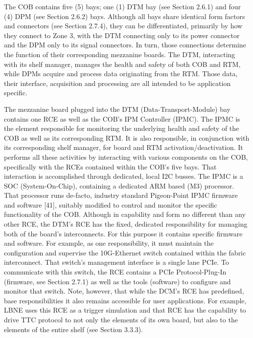 The COB contains five (5) bays; one (1) DTM bay (see Section 2.6.1) and four (4) DPM (see Section 2.6.2) bays. Although all bays share identical form factors and connectors (see Section 2.7.4), they can be differentiated, primarily by how they connect to Zone 3, with the DTM connecting only to its power connector and the DPM only to its signal connectors. In turn, those connections determine the function of their corresponding mezzanine boards. The DTM, interacting with its shelf manager, manages the health and safety of both COB and RTM, while DPMs acquire and process data originating from the RTM. Those data, their interface, acquisition and processing are all intended to be application specific.

The mezzanine board plugged into the DTM (Data-Transport-Module) bay contains one RCE as well as the COB's IPM Controller (IPMC). The IPMC is the element responsible for monitoring the underlying health and safety of the COB as well as its corresponding RTM. It is also responsible, in conjunction with its corresponding shelf manager, for board and RTM activation/deactivation. It performs all these activities by interacting with various components on the COB, specifically with the RCEs contained within the COB's five bays. That interaction is accomplished through dedicated, local I2C busses. The IPMC is a SOC (System-On-Chip), containing a dedicated ARM based (M3) processor. That processor runs de-facto, industry standard Pigeon-Point IPMC firmware and software [41], suitably modified to control and monitor the specific functionality of the COB.
Although in capability and form no different than any other RCE, the DTM's RCE has the fixed, dedicated responsibility for managing both of the board's interconnects. For this purpose it contains specific firmware and software. For example, as one responsibility, it must maintain the configuration and supervise the 10G-Ethernet switch contained within the fabric interconnect. That switch's management interface is a single lane PCIe. To communicate with this switch, the RCE contains a PCIe Protocol-Plug-In (firmware, see Section 2.7.1) as well as the tools (software) to configure and monitor that switch. Note, however, that while the DCM's RCE has predefined, base responsibilities it also remains accessible for user applications. For example, LBNE uses this RCE as a trigger simulation and that RCE has the capability to drive TTC protocol to not only the elements of its own board, but also to the elements of the entire shelf (see Section 3.3.3).

